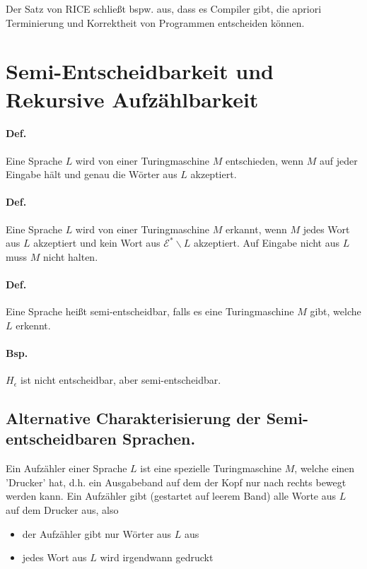 \para{} Der Satz von RICE schließt bspw. aus, dass es Compiler gibt, die apriori Terminierung und Korrektheit von Programmen entscheiden können.


\section{Semi-Entscheidbarkeit und Rekursive Aufzählbarkeit}

\paragraph*{Def.} Eine Sprache $L$ wird von einer Turingmaschine $M$ entschieden, wenn $M$ auf jeder Eingabe hält und genau die Wörter aus $L$ akzeptiert.


\paragraph*{Def.} Eine Sprache $L$ wird von einer Turingmaschine $M$ erkannt, wenn $M$ jedes Wort aus $L$ akzeptiert und kein Wort aus $\mathcal{E}^*\backslash L$ akzeptiert. Auf Eingabe nicht aus $L$ muss $M$ nicht halten.

\paragraph*{Def.} Eine Sprache heißt semi-entscheidbar, falls es eine Turingmaschine $M$ gibt, welche $L$ erkennt.

\paragraph*{Bsp.} $H_\epsilon$ ist nicht entscheidbar, aber semi-entscheidbar.

\subsection{Alternative Charakterisierung der Semi-entscheidbaren Sprachen.}

Ein Aufzähler einer Sprache $L$ ist eine spezielle Turingmaschine $M$, welche einen 'Drucker' hat, d.h. ein Ausgabeband auf dem der Kopf nur nach rechts bewegt werden kann. Ein Aufzähler gibt (gestartet auf leerem Band) alle Worte aus $L$ auf dem Drucker aus, also
\begin{itemize}
	\item der Aufzähler gibt nur Wörter aus $L$ aus
	\item jedes Wort aus $L$ wird irgendwann gedruckt
\end{itemize}

